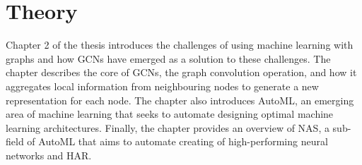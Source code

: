 \chapter{Theory}
\begin{comment}
This chapter will contain the essential theory for the thesis. 

As the authors did a literature review as a pre-study for this project, some subchapters will be re-used as the theory is still highly relevant for this thesis. 
\end{comment}
Chapter 2 of the thesis introduces the challenges of using machine learning with graphs and how GCNs have emerged as a solution to these challenges. The chapter describes the core of GCNs, the graph convolution operation, and how it aggregates local information from neighbouring nodes to generate a new representation for each node. The chapter also introduces \Gls{AutoML}, an emerging area of machine learning that seeks to automate designing optimal machine learning architectures. Finally, the chapter provides an overview of NAS, a sub-field of AutoML that aims to automate creating of high-performing neural networks and HAR. 





 

